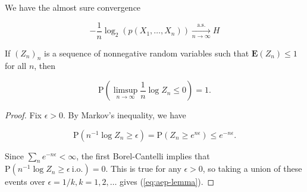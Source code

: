 \begin{thm}
\label{thm-shannon-mcmillan-breiman}
We have the almost sure convergence

\begin{equation*} \tag{33}\label{eq:shannon-mcmillan-breiman}
-\frac{1}{n}\log_2(p(X_1,\ldots,X_n)) \xrightarrow[n\to\infty]{\textrm{a.s.}} H
\end{equation*}

\end{thm}

\begin{lem}
\label{lem-aep-lemma}
If $(Z_n)_n$ is a sequence of nonnegative random
variables such that $\mathbf{E}(Z_n)\le 1$ for all
$n$, then

\begin{equation*} \tag{34}\label{eq:aep-lemma}
\mathrm{P}\left(\limsup_{n\to\infty} \frac{1}{n} \log Z_n \le 0\right) = 1.
\end{equation*}

\end{lem}

\begin{proof}
Fix $\epsilon>0$. By Markov's inequality, we have

\[
\mathrm{P}(n^{-1} \log Z_n \ge \epsilon) = \mathrm{P}(Z_n \ge e^{n\epsilon}) \le e^{-n\epsilon}.
\]

\noindent Since $\sum_n e^{-n\epsilon}<\infty$, the first
Borel-Cantelli implies that
$\mathrm{P}(n^{-1} \log Z_n \ge \epsilon \
\textrm{i.o.}) = 0$.
This is true for any $\epsilon>0$, so taking a union
of these events over $\epsilon=1/k, k=1,2,\ldots$
gives (\ref{eq:aep-lemma}).
\end{proof}

